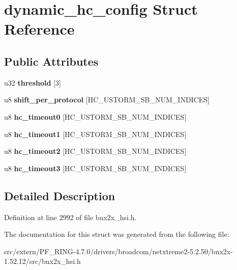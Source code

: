 \hypertarget{structdynamic__hc__config}{
\section{dynamic\_\-hc\_\-config Struct Reference}
\label{structdynamic__hc__config}
}
\subsection*{Public Attributes}
\begin{DoxyCompactItemize}
\item 
\hypertarget{structdynamic__hc__config_a3bffa55c99125c40c14a7ce6a22b47f2}{
u32 {\bfseries threshold} \mbox{[}3\mbox{]}}
\label{structdynamic__hc__config_a3bffa55c99125c40c14a7ce6a22b47f2}

\item 
\hypertarget{structdynamic__hc__config_a3541d35926d8f24b51224e65d3e47a12}{
u8 {\bfseries shift\_\-per\_\-protocol} \mbox{[}HC\_\-USTORM\_\-SB\_\-NUM\_\-INDICES\mbox{]}}
\label{structdynamic__hc__config_a3541d35926d8f24b51224e65d3e47a12}

\item 
\hypertarget{structdynamic__hc__config_a206e9a289747d4c510c0da4a48971a13}{
u8 {\bfseries hc\_\-timeout0} \mbox{[}HC\_\-USTORM\_\-SB\_\-NUM\_\-INDICES\mbox{]}}
\label{structdynamic__hc__config_a206e9a289747d4c510c0da4a48971a13}

\item 
\hypertarget{structdynamic__hc__config_a72489b98e8dc8d6d9e6fe6223876609e}{
u8 {\bfseries hc\_\-timeout1} \mbox{[}HC\_\-USTORM\_\-SB\_\-NUM\_\-INDICES\mbox{]}}
\label{structdynamic__hc__config_a72489b98e8dc8d6d9e6fe6223876609e}

\item 
\hypertarget{structdynamic__hc__config_a9b02dafefb151beec3cefe65b4cf1a33}{
u8 {\bfseries hc\_\-timeout2} \mbox{[}HC\_\-USTORM\_\-SB\_\-NUM\_\-INDICES\mbox{]}}
\label{structdynamic__hc__config_a9b02dafefb151beec3cefe65b4cf1a33}

\item 
\hypertarget{structdynamic__hc__config_a33bc762503e7f0fd34d6f8632004c289}{
u8 {\bfseries hc\_\-timeout3} \mbox{[}HC\_\-USTORM\_\-SB\_\-NUM\_\-INDICES\mbox{]}}
\label{structdynamic__hc__config_a33bc762503e7f0fd34d6f8632004c289}

\end{DoxyCompactItemize}


\subsection{Detailed Description}


Definition at line 2992 of file bnx2x\_\-hsi.h.



The documentation for this struct was generated from the following file:\begin{DoxyCompactItemize}
\item 
src/extern/PF\_\-RING-\/4.7.0/drivers/broadcom/netxtreme2-\/5.2.50/bnx2x-\/1.52.12/src/bnx2x\_\-hsi.h\end{DoxyCompactItemize}
